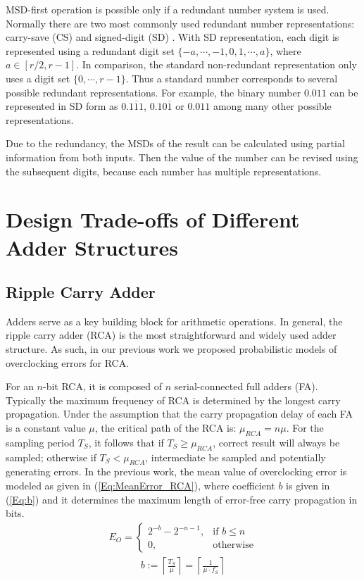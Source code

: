 \documentclass[10pt, conference, compsocconf]{IEEEtran}
\begin{document}
MSD-first operation is possible only if a redundant number system is used. Normally there are two most commonly used redundant number representations: carry-save (CS) \cite{CSadder} and signed-digit (SD) \cite{RedundantNumber}. With SD representation, each digit is represented using a redundant digit set $\{-a, \cdots,-1,0, 1, \cdots, a\}$, where $a\in[r/2,r-1]$. In comparison, the standard non-redundant representation only uses a digit set $\{0,\cdots,r-1\}$. Thus a standard number corresponds to several possible redundant representations. For example, the binary number $0.011$ can be represented in SD form as $0.1\overline{1}1$, $0.10\overline{1}$ or $0.011$ among many other possible representations.

Due to the redundancy, the MSDs of the result can be calculated using partial information from both inputs. Then the value of the number can be revised using the subsequent digits, because each number has multiple representations.

\section{Design Trade-offs of Different Adder Structures}\label{sec:diff_adder}
\subsection{Ripple Carry Adder}
Adders serve as a key building block for arithmetic operations. In general, the ripple carry adder (RCA) is the most straightforward and widely used adder structure. As such, in our previous work we proposed probabilistic models of overclocking errors for RCA.

For an $n$-bit RCA, it is composed of $n$ serial-connected full adders (FA). Typically the maximum frequency of RCA is determined by the longest carry propagation. Under the assumption that the carry propagation delay of each FA is a constant value $\mu$, the critical path of the RCA is: $\mu_{RCA}=n\mu$. For the sampling period $T_S$, it follows that if $T_S\geqslant\mu_{RCA}$, correct result will always be sampled; otherwise if $T_S<\mu_{RCA}$, intermediate be sampled and potentially generating errors. In the previous work, the mean value of overclocking error is modeled as given in (\ref{Eq:MeanError_RCA}), where coefficient $b$ is given in (\ref{Eq:b}) and it determines the maximum length of error-free carry propagation in bits.
%
\begin{eqnarray}\label{Eq:MeanError_RCA}
    E_O=\left\{
        \begin{matrix}
            2^{-b}-2^{-n-1}, & \textrm{if $b\leq n$}\\
            0, & \textrm{otherwise}
        \end{matrix}
        \right.
\end{eqnarray}
%
\begin{eqnarray}\label{Eq:b}
    b:=\left\lceil \frac{T_S}{\mu} \right\rceil=\left\lceil \frac{1}{\mu\cdot f_S}\right\rceil
\end{eqnarray}
\end{document}

